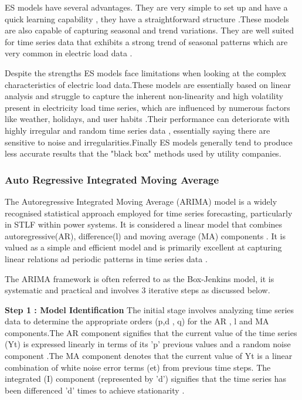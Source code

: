  ES models have several advantages. They are very simple to set up and have a quick learning capability  , they have a straightforward structure \cite{tshipata2024multi}.These models are also capable of capturing seasonal and trend variations. They are well suited for time series data that exhibits a strong trend of seasonal patterns which are very common in electric load data \cite{ramos2015performance}.
 
Despite the strengths ES models face limitations when looking at the complex characteristics of electric load data.These models are essentially based on linear analysis and struggle to capture the inherent non-linearity and high volatility present in electricity load time series, which are influenced by numerous factors like weather, holidays, and user habits \cite{tshipata2024multi}.Their performance can deteriorate with highly irregular and random time series data \cite{wang2019novel} , essentially saying there are sensitive to noise and irregularities.Finally ES models generally tend to produce less accurate results that the "black box" methods used by utility companies\cite{takeda2016using}.
 
 \subsubsection{Auto Regressive Integrated Moving Average}
 The Autoregressive Integrated Moving Average (ARIMA) model is a widely recognised statistical approach employed for time series forecasting, particularly in STLF within power systems. It is considered a linear model that combines autoregressive(AR), difference(l) and moving average (MA) components \cite{revathi2025short}. It is valued as a simple and efficient model and is primarily excellent at capturing linear relations ad periodic patterns in time series data \cite{ramos2015performance}.
 
 The  ARIMA framework is often referred to as the Box-Jenkins model, it is systematic and practical and involves 3 iterative steps as discussed below.
 
\textbf{Step 1 : Model Identification} The initial stage involves analyzing time series data to determine the appropriate orders (p,d , q) for the AR , l and MA components.The AR component signifies that the current value of the time series (Yt)  is expressed linearly in terms of its 'p' previous values and a random noise component \cite{dai2020short}.The MA component denotes that the current value of Yt is a linear combination of white noise error terms (et) from previous time steps. The integrated (I) component (represented by 'd') signifies that the time series has been differenced 'd' times to achieve stationarity \cite{ahmed2020review}.

